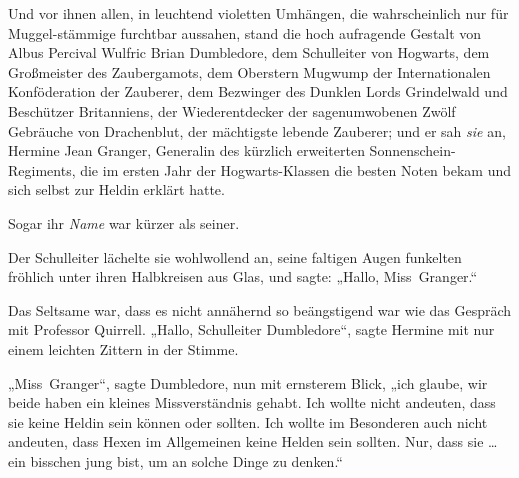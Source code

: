 Und vor ihnen allen, in leuchtend violetten Umhängen, die wahrscheinlich nur für Muggel-stämmige furchtbar aussahen, stand die hoch aufragende Gestalt von Albus Percival Wulfric Brian Dumbledore, dem Schulleiter von Hogwarts, dem Großmeister des Zaubergamots, dem Oberstern Mugwump der Internationalen Konföderation der Zauberer, dem Bezwinger des Dunklen Lords Grindelwald und Beschützer Britanniens, der Wiederentdecker der sagenumwobenen Zwölf Gebräuche von Drachenblut, der mächtigste lebende Zauberer; und er sah \emph{sie} an, Hermine Jean Granger, Generalin des kürzlich erweiterten Sonnenschein-Regiments, die im ersten Jahr der Hogwarts-Klassen die besten Noten bekam und sich selbst zur Heldin erklärt hatte.

Sogar ihr \emph{Name} war kürzer als seiner.

Der Schulleiter lächelte sie wohlwollend an, seine faltigen Augen funkelten fröhlich unter ihren Halbkreisen aus Glas, und sagte:
„Hallo, Miss~Granger.“

Das Seltsame war, dass es nicht annähernd so beängstigend war wie das Gespräch mit Professor Quirrell.
„Hallo, Schulleiter Dumbledore“, sagte Hermine mit nur einem leichten Zittern in der Stimme.

„Miss~Granger“, sagte Dumbledore, nun mit ernsterem Blick, „ich glaube, wir beide haben ein kleines Missverständnis gehabt. Ich wollte nicht andeuten, dass sie keine Heldin sein können oder sollten. Ich wollte im Besonderen auch nicht andeuten, dass Hexen im Allgemeinen keine Helden sein sollten. Nur, dass sie … ein bisschen jung bist, um an solche Dinge zu denken.“

